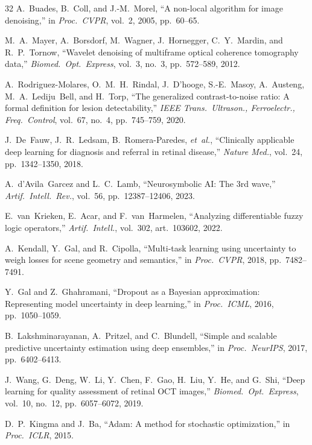 \documentclass[journal,twoside,web]{ieeecolor}
\begin{document}
{\begin{thebibliography}{32}
A.~Buades, B.~Coll, and J.-M.~Morel, ``A non-local algorithm for image denoising,'' in \emph{Proc.\ CVPR}, vol.~2, 2005, pp.~60--65.

M.~A.~Mayer, A.~Borsdorf, M.~Wagner, J.~Hornegger, C.~Y.~Mardin, and R.~P.~Tornow, ``Wavelet denoising of multiframe optical coherence tomography data,'' \emph{Biomed.\ Opt.\ Express}, vol.~3, no.~3, pp.~572--589, 2012.

A.~Rodriguez-Molares, O.~M.~H.~Rindal, J.~D'hooge, S.-E.~Masoy, A.~Austeng, M.~A.~Lediju~Bell, and H.~Torp, ``The generalized contrast-to-noise ratio: A formal definition for lesion detectability,'' \emph{IEEE Trans.\ Ultrason., Ferroelectr., Freq.\ Control}, vol.~67, no.~4, pp.~745--759, 2020.

J.~De~Fauw, J.~R.~Ledsam, B.~Romera-Paredes, \emph{et~al.}, ``Clinically applicable deep learning for diagnosis and referral in retinal disease,'' \emph{Nature Med.}, vol.~24, pp.~1342--1350, 2018.

A.~d'Avila~Garcez and L.~C.~Lamb, ``Neurosymbolic AI: The 3rd wave,'' \emph{Artif.\ Intell.\ Rev.}, vol.~56, pp.~12387--12406, 2023.

E.~van~Krieken, E.~Acar, and F.~van~Harmelen, ``Analyzing differentiable fuzzy logic operators,'' \emph{Artif.\ Intell.}, vol.~302, art.~103602, 2022.

A.~Kendall, Y.~Gal, and R.~Cipolla, ``Multi-task learning using uncertainty to weigh losses for scene geometry and semantics,'' in \emph{Proc.\ CVPR}, 2018, pp.~7482--7491.

Y.~Gal and Z.~Ghahramani, ``Dropout as a Bayesian approximation: Representing model uncertainty in deep learning,'' in \emph{Proc.\ ICML}, 2016, pp.~1050--1059.

B.~Lakshminarayanan, A.~Pritzel, and C.~Blundell, ``Simple and scalable predictive uncertainty estimation using deep ensembles,'' in \emph{Proc.\ NeurIPS}, 2017, pp.~6402--6413.

J.~Wang, G.~Deng, W.~Li, Y.~Chen, F.~Gao, H.~Liu, Y.~He, and G.~Shi, ``Deep learning for quality assessment of retinal OCT images,'' \emph{Biomed.\ Opt.\ Express}, vol.~10, no.~12, pp.~6057--6072, 2019.

D.~P.~Kingma and J.~Ba, ``Adam: A method for stochastic optimization,'' in \emph{Proc.\ ICLR}, 2015.



\end{thebibliography}}
\end{document}
